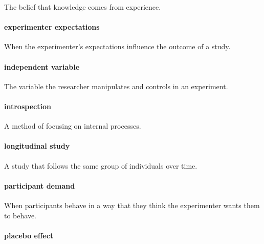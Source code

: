 \documentclass[
]{krantz}
\begin{document}
The belief that knowledge comes from experience.

\hypertarget{experimenter-expectations}{%
\paragraph*{experimenter expectations}\label{experimenter-expectations}}

When the experimenter's expectations influence the outcome of a study.

\hypertarget{independent-variable}{%
\paragraph*{independent variable}\label{independent-variable}}

The variable the researcher manipulates and controls in an experiment.

\hypertarget{introspection}{%
\paragraph*{introspection}\label{introspection}}

A method of focusing on internal processes.

\hypertarget{longitudinal-study}{%
\paragraph*{longitudinal study}\label{longitudinal-study}}

A study that follows the same group of individuals over time.

\hypertarget{participant-demand}{%
\paragraph*{participant demand}\label{participant-demand}}

When participants behave in a way that they think the experimenter wants them to behave.

\hypertarget{placebo-effect}{%
\paragraph*{placebo effect}\label{placebo-effect}}
\end{document}
